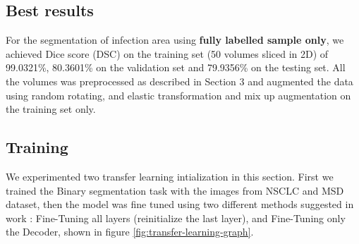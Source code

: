 \subsection{Best results}
For the segmentation of infection area using \textbf{fully labelled sample only}, we achieved Dice score (DSC) on the training set (50 volumes sliced in 2D) of 99.0321\%, 80.3601\% on the validation set and 79.9356\% on the testing set. All the volumes was preprocessed as described in Section 3 and augmented the data using random rotating, and elastic transformation and {\color{red}mix up augmentation} on the training set only.

\subsection{Training}
We experimented two transfer learning intialization in this section. First we trained the Binary segmentation task with the images from NSCLC and MSD dataset, then the model was fine tuned using two different methods suggested in work \cite{wang_improving_2019}: Fine-Tuning all layers (reinitialize the last layer), and Fine-Tuning only the Decoder, shown in figure \ref{fig:transfer-learning-graph}.\\

